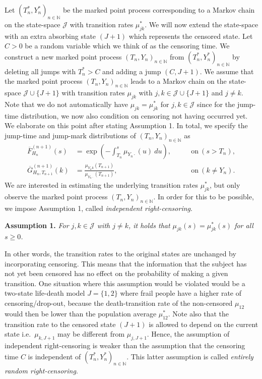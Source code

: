 \documentclass[a4paper,10pt,openany]{book}
\begin{document}
Let \((T_n^*,Y_n^*)_{n\in \mathbb N}\) be the marked point process corresponding to a Markov chain on the state-space \(\mathcal J\) with transition rates \(\mu^*_{jk}\). We will now extend the state-space with an extra absorbing state \((J + 1)\) which represents the censored state. Let \(C > 0\) be a random variable which we think of as the censoring time. We construct a new marked point process \((T_n,Y_n)_{n\in\mathbb N}\) from \((T_n^*, Y_n^*)_{n\in\mathbb N}\) by deleting all jumps with \(T_n^* > C\) and adding a jump \((C, J +1)\). We assume that the marked point process \((T_n, Y_n)_{n\in\mathbb N}\) leads to a Markov chain on the state-space \(\mathcal J \cup \{J + 1\}\) with transition rates \(\mu_{jk}\) with \(j,k \in \mathcal J \cup \{J + 1\}\) and \(j\ne k\). Note that we do not automatically have \(\mu_{jk} = \mu_{jk}^*\) for \(j,k \in\mathcal J\) since for the jump-time distribution, we now also condition on censoring not having occurred yet. We elaborate on this point after stating Assumption 1. In total, we specify the jump-time and jump-mark distributions of \((T_n,Y_n)_{n\in\mathbb N}\) as
\begin{align*}
\overline F_{H_n}^{(n+1)}(s)&=\exp\left(-\int_{T_n}^s\mu_{Y_n\cdot}(u)\ du \right),&\qquad\text{on}\ (s>T_n),\\
\overline G_{H_n,T_{n+1}}^{(n+1)}(k)&=\frac{\mu_{Y_nk}(T_{n+1})}{\mu_{Y_n\cdot}(T_{n+1})},&\qquad\text{on}\ (k\ne Y_n).
\end{align*}
We are interested in estimating the underlying transition rates \(\mu^*_{jk}\), but only observe the marked point process \((T_n,Y_n)_{n\in\mathbb N}\). In order for this to be possible, we impose Assumption 1, called \emph{independent right-censoring}.

\textbf{Assumption 1.} \emph{For \(j,k\in\mathcal J\) with \(j\ne k\), it holds that \(\mu_{jk}(s)=\mu^*_{jk}(s)\) for all \(s\ge 0\).}

In other words, the transition rates to the original states are unchanged by incorporating censoring. This means that the information that the subject has not yet been censored has no effect on the probability of making a given transition. One situation where this assumption would be violated would be a two-state life-death model \(J = \{1, 2\}\) where frail people have a higher rate of censoring/drop-out, because the death-transition rate of the non-censored \(\mu_{12}\) would then be lower than the population average \(\mu^*_{12}\). Note also that the transition rate to the censored state \((J + 1)\) is allowed to depend on the current state i.e.~\(\mu_{k,J+1}\) may be different from \(\mu_{j,J+1}\). Hence, the assumption of independent right-censoring is weaker than the assumption that the censoring time \(C\) is independent of \((T_n^* ,Y_n^*)_{n\in\mathbb N}\). This latter assumption is called \emph{entirely random right-censoring}.
\end{document}

